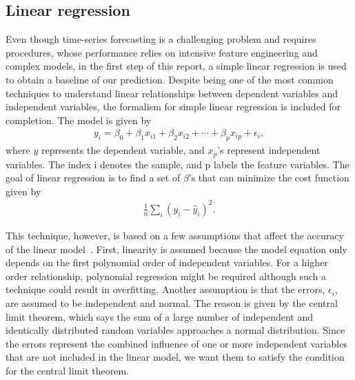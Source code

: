 \documentclass[prl,aps,superscriptaddress,twocolumn,10pt,nolongbibliography]{revtex4-2}
\begin{document}
\subsection{Linear regression}
Even though time-series forecasting is a challenging problem and requires procedures, whose performance relies on intensive feature engineering and complex models, in the first step of this report, a simple linear regression is used to obtain a baseline of our prediction. 
Despite being one of the most common techniques to understand linear relationships between dependent variables and independent variables, the formalism for simple linear regression is included for completion. 
The model is given by 
\begin{align}
y_i = \beta_0 + \beta_1 x_{i1} + \beta_2 x_{i2} + \cdots + \beta_p x_{ip} + \epsilon_i, 
\end{align}
where $y$ represents the dependent variable, and $x_p$'s represent independent variables. 
The index i denotes the sample, and p labels the feature variables. The goal of linear regression is to find a set of $\beta$'s that can minimize the cost function given by 
\begin{align}
\frac{1}{n} \sum_i (y_{i} - \hat{y}_{i})^2.
\end{align}

This technique, however, is based on a few assumptions that affect the accuracy of the linear model~\cite{hayashi2011econometrics}. 
First, linearity is assumed because the model equation only depends on the first polynomial order of independent variables. 
For a higher order relationship, polynomial regression might be required although such a technique could result in overfitting. 
Another assumption is that the errors, $\epsilon_i$, are assumed to be independent and normal. 
The reason is given by the central limit theorem, which says the sum of a large number of independent and identically distributed random variables approaches a normal distribution. 
Since the errors represent the combined influence of one or more independent variables that are not included in the linear model, we want them to satisfy the condition for the central limit theorem. 
\end{document}
